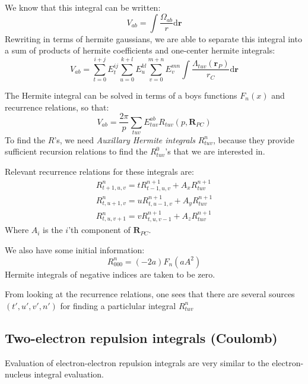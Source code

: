 \documentclass[a4paper,10pt, twocolumn, pre]{revtex4}
\newcommand{\rvec}{\mathbf{r}}
\newcommand{\dd}{\mathrm{d}}
\newcommand{\mb}{\mathbf}
\begin{document}
We know that this integral can be written:
\begin{equation}
	V_{ab} = \int \frac{\Omega_{ab}}{r}\dd \rvec  
\end{equation}
Rewriting in terms of hermite gaussians, we are able to separate this integral into a sum of products of hermite coefficients and one-center hermite integrals:
\begin{equation}
	V_{ab} = \sum_{t=0}^{i+j}E_{t}^{ij}\sum_{u=0}^{k+l}E_{u}^{kl}\sum_{v=0}^{m+n}E_{v}^{mn} \int \frac{\Lambda_{tuv}(\rvec_P)}{r_C} \dd \rvec
\end{equation}

The Hermite integral can be solved in terms of a boys functions $F_n(x)$ and recurrence relations, so that:
\begin{equation}
	V_{ab} = \frac{2\pi}{p}\sum_{tuv} E_{tuv}^{ab} R_{tuv}(p, \mb{R}_{PC})
\end{equation}
To find the $R$'s, we need \emph{Auxillary Hermite integrals} $R_{tuv}^n$, because they provide sufficient recursion relations to find the $R_{tuv}^0$'s that we are interested in.

Relevant recurrence relations for these integrals are:
\begin{align}
R_{t+1, u, v}^n = tR_{t-1, u, v}^{n+1} + A_xR_{tuv}^{n+1} \\
R_{t, u+1, v}^n = uR_{t, u-1, v}^{n+1} + A_yR_{tuv}^{n+1} \\
R_{t, u, v+1}^n = vR_{t, u, v-1}^{n+1} + A_zR_{tuv}^{n+1}
\end{align}
Where $A_i$ is the $i$'th component of $\mb{R}_{PC}$.

We also have some initial information:
\begin{equation}
	R_{000}^n = (-2a)F_n(aA^2)
\end{equation}
Hermite integrals of negative indices are taken to be zero.

From looking at the recurrence relations, one sees that there are several sources $(t', u', v', n')$ for finding a particlular integral $R_{tuv}^{n}$

\subsection{Two-electron repulsion integrals (Coulomb)}
Evaluation of electron-electron repulsion integrals are very similar to the electron-nucleus integral evaluation.
\end{document}

